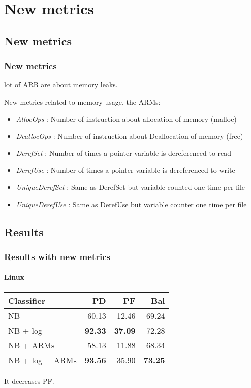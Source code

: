 \section{New metrics}

\subsection{New metrics}
\begin{frame}
 \frametitle{New metrics}%
 \begin{center}
  \alert{lot of ARB are about memory leaks.}
 \end{center}
 New metrics related to memory usage, the \alert{ARMs}:
 \begin{itemize}
  \item \emph{AllocOps} : Number of instruction about allocation of memory (malloc)
  \item \emph{DeallocOps} : Number of instruction about Deallocation of memory (free)
  \item \emph{DerefSet} : Number of times a pointer variable is dereferenced to read%
  \item \emph{DerefUse} : Number of times a pointer variable is dereferenced to write
  \item \emph{UniqueDerefSet} : Same as DerefSet but variable counted one time per file
  \item \emph{UniqueDerefUse} : Same as DerefUse but variable counter one time per file
 \end{itemize}
\end{frame}

\subsection{Results}
\begin{frame}
 \frametitle{Results with new metrics}
 \framesubtitle{Linux}
 \begin{center}
 \begin{tabular}{lrrr}
  \hspace{0.2cm} Classifier & PD & PF & Bal\\
  \hline
  NB & 60.13 & 12.46 & 69.24\\
  NB + log &  \textbf{92.33} & \textbf{37.09} & 72.28\\
  NB + ARMs & 58.13 & 11.88 & 68.34\\
  NB + log + ARMs & \textbf{93.56} & 35.90 & \textbf{73.25}\\
  \hline
 \end{tabular}
 \end{center}
 \vspace{0.5cm}
 It decreases PF.
\end{frame}

